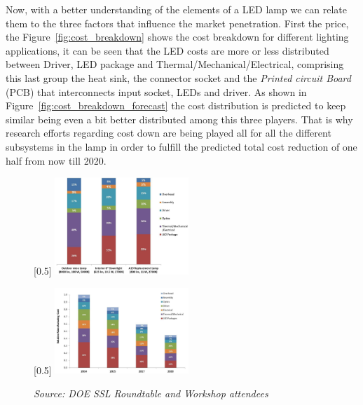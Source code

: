 Now, with a better understanding of the elements of a LED lamp we can relate them to the three factors that influence the market penetration. First the price, the Figure~\ref{fig:cost_breakdown} shows the cost breakdown for different lighting applications, it can be seen that the LED costs are more or less distributed between Driver, LED package and Thermal/Mechanical/Electrical, comprising this last group the heat sink, the connector socket and the \emph{Printed circuit Board} (PCB) that interconnects input socket, LEDs and driver. As shown in Figure~\ref{fig:cost_breakdown_forecast} the cost distribution is predicted to keep similar being even a bit better distributed among this three players. That is why research efforts regarding cost down are being played all for all the different subsystems in the lamp in order to fulfill the predicted total cost reduction of one half from now till 2020.  

%

\begin{figure}[!h]
\centering
\subcaptionbox{\label{fig:cost_breakdown}}[0.5\textwidth]
   {\includegraphics[width=0.45\textwidth]{./0_intro/img/cost_breakdown.png}}

\subcaptionbox{\label{fig:cost_breakdown_forecast}}[0.5\textwidth]
   {\includegraphics[width=0.45\textwidth]{./0_intro/img/cost_breakdown_forecast.png}}
\caption{\emph{Source: DOE SSL Roundtable and Workshop attendees}}
\label{fig:costs_BD_FC}
\end{figure}

